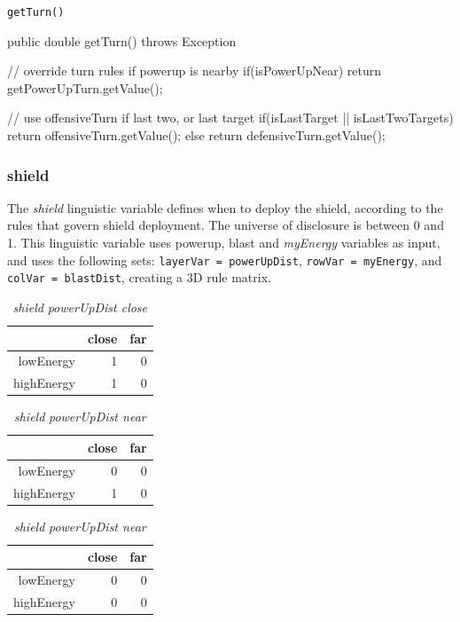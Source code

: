 \begin{listing}[H]
\caption{\texttt{getTurn()}}
\begin{javacode}
public double getTurn() throws Exception {

    // override turn rules if powerup is nearby
    if(isPowerUpNear) {
        return getPowerUpTurn.getValue();
    }
	
    // use offensiveTurn if last two, or last target
    if(isLastTarget || isLastTwoTargets) {
        return offensiveTurn.getValue();
    } else {
        return defensiveTurn.getValue();
    }
}
\end{javacode}
\end{listing}

\subsubsection{shield}

The \emph{shield} linguistic variable defines when to deploy the shield, according to the rules that govern shield deployment. The universe of disclosure is between 0 and 1. This linguistic variable uses powerup, blast and \emph{myEnergy} variables as input, and uses the following sets: \texttt{layerVar = powerUpDist}, \texttt{rowVar = myEnergy}, and \texttt{colVar = blastDist}, creating a 3D rule matrix. 

\begin{table}[H]
\centering
\caption{\emph{shield} \emph{powerUpDist close}}
\label{Turn rule table}
\begin{tabular}{r|r|r}
 			& close 	& far	 	\\ \hline
lowEnergy	& 1			& 0			\\
highEnergy	& 1			& 0		
\end{tabular}
\end{table}

\begin{table}[H]
\centering
\caption{\emph{shield} \emph{powerUpDist near}}
\label{Turn rule table}
\begin{tabular}{r|r|r}
 			& close 	& far	 	\\ \hline
lowEnergy	& 0			& 0			\\
highEnergy	& 1			& 0		
\end{tabular}
\end{table}

\begin{table}[H]
\centering
\caption{\emph{shield} \emph{powerUpDist near}}
\label{Turn rule table}
\begin{tabular}{r|r|r}
 			& close 	& far	 	\\ \hline
lowEnergy	& 0			& 0			\\
highEnergy	& 0			& 0		
\end{tabular}
\end{table}

